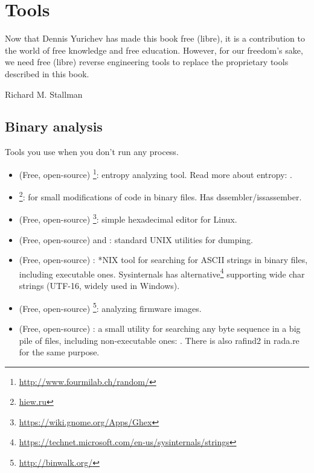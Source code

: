 \chapter{Tools}

\epigraph{Now that Dennis Yurichev has made this book free (libre), it is a
contribution to the world of free knowledge and free education.
However, for our freedom's sake, we need free (libre) reverse
engineering tools to replace the proprietary tools described in this book.}{Richard M. Stallman}

\section{Binary analysis}

Tools you use when you don't run any process.


\begin{itemize}
\item
(Free, open-source) \footnote{\url{http://www.fourmilab.ch/random/}}: entropy analyzing tool.
Read more about entropy: .

\item
\label{Hiew}
\footnote{\href{http://go.yurichev.com/17035}{hiew.ru}}:
for small modifications of code in binary files.
Has dssembler/issassember.

\item (Free, open-source) \footnote{\url{https://wiki.gnome.org/Apps/Ghex}}: simple hexadecimal editor for Linux.

\item (Free, open-source)  and : standard UNIX utilities for dumping.

\item (Free, open-source) : *NIX tool for searching for ASCII strings in binary files, including executable ones.
Sysinternals has alternative\footnote{\url{https://technet.microsoft.com/en-us/sysinternals/strings}}
supporting wide char strings (UTF-16, widely used in Windows).

\item (Free, open-source) \footnote{\url{http://binwalk.org/}}: analyzing firmware images.

\item
{}
(Free, open-source) :
a small utility for searching any byte sequence in a big pile of files, 
including non-executable ones: \BGREPURL.
There is also rafind2 in rada.re for the same purpose.
\end{itemize}

